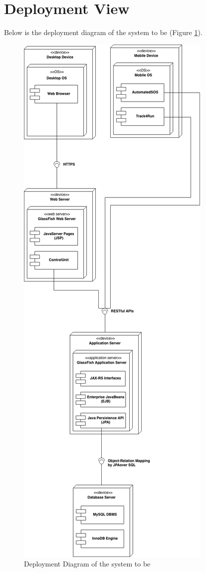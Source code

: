 \clearpage

\section{Deployment View}
Below is the deployment diagram of the system to be (Figure \ref{img:Deployment_Diagram}).

\begin{figure}[H]
  \begin{center}
  	\includegraphics[height=0.59\paperheight]{./img/Deployment_Diagram.png}
    \hspace{0.05\linewidth}
    \centering
    \caption{Deployment Diagram of the system to be}
		\label{img:Deployment_Diagram}
    \end{center}
\end{figure}

